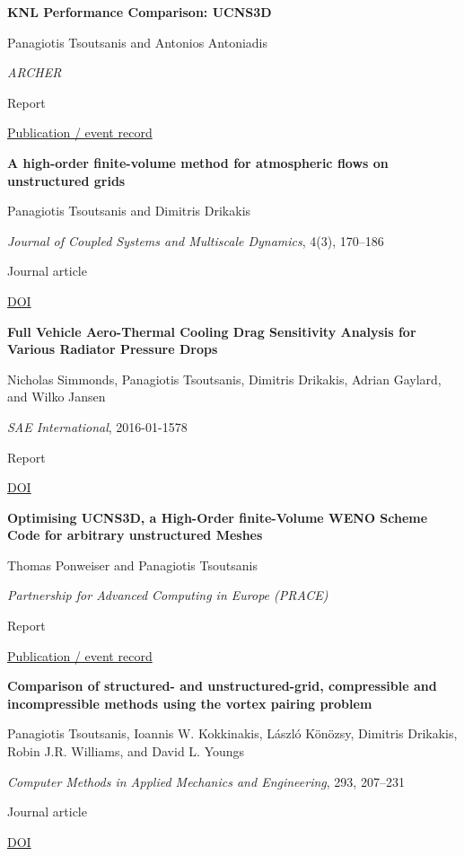 \documentclass[11pt,a4paper]{article}
\newlength{\cventrysep}
\newenvironment{cventry}{%
  \par\noindent\begin{minipage}{\linewidth}
  \RaggedRight\fontsize{9.8}{12.5}\selectfont
}{\end{minipage}\par\addvspace{\cventrysep}}
\newcommand{\cvtitle}[1]{{\bfseries #1\par}\vspace{1pt}}
\newcommand{\cvdetail}[1]{{#1\par}\vspace{1pt}}
\newcommand{\cvmeta}[1]{{\fontsize{9}{11.5}\selectfont\color{Muted}#1\par}\vspace{1pt}}
\newcommand{\cvlinks}[1]{{\fontsize{9}{11.5}\selectfont #1\par}}
\newcommand{\cvyear}[1]{{\color{Teal}\bfseries\fontsize{11}{13}\selectfont #1\par}\vspace{6pt}}
\begin{document}
\begin{cventry}
\cvtitle{KNL Performance Comparison: UCNS3D}
\cvdetail{Panagiotis Tsoutsanis and Antonios Antoniadis}
\cvmeta{\textit{ARCHER}\par Report}
\cvlinks{\href{https://www.archer.ac.uk/community/benchmarks/archer-knl/KNL\_perf\_UCNS3D.pdf}{Publication / event record}}
\end{cventry}

\begin{cventry}
\cvyear{2016}
\cvtitle{A high-order finite-volume method for atmospheric flows on unstructured grids}
\cvdetail{Panagiotis Tsoutsanis and Dimitris Drikakis}
\cvmeta{\textit{Journal of Coupled Systems and Multiscale Dynamics}, 4(3), 170--186\par Journal article}
\cvlinks{\href{https://doi.org/10.1166/jcsmd.2016.1104}{DOI}}
\end{cventry}

\begin{cventry}
\cvtitle{Full Vehicle Aero-Thermal Cooling Drag Sensitivity Analysis for Various Radiator Pressure Drops}
\cvdetail{Nicholas Simmonds, Panagiotis Tsoutsanis, Dimitris Drikakis, Adrian Gaylard, and Wilko Jansen}
\cvmeta{\textit{SAE International}, 2016-01-1578\par Report}
\cvlinks{\href{https://doi.org/10.4271/2016-01-1578}{DOI}}
\end{cventry}

\begin{cventry}
\cvtitle{Optimising UCNS3D, a High-Order finite-Volume WENO Scheme Code for arbitrary unstructured Meshes}
\cvdetail{Thomas Ponweiser and Panagiotis Tsoutsanis}
\cvmeta{\textit{Partnership for Advanced Computing in Europe (PRACE)}\par Report}
\cvlinks{\href{https://prace-ri.eu/wp-content/uploads/WP222.pdf}{Publication / event record}}
\end{cventry}

\begin{cventry}
\cvyear{2015}
\cvtitle{Comparison of structured- and unstructured-grid, compressible and incompressible methods using the vortex pairing problem}
\cvdetail{Panagiotis Tsoutsanis, Ioannis W. Kokkinakis, László Könözsy, Dimitris Drikakis, Robin J.R. Williams, and David L. Youngs}
\cvmeta{\textit{Computer Methods in Applied Mechanics and Engineering}, 293, 207--231\par Journal article}
\cvlinks{\href{https://doi.org/10.1016/j.cma.2015.04.010}{DOI}}
\end{cventry}
\end{document}
